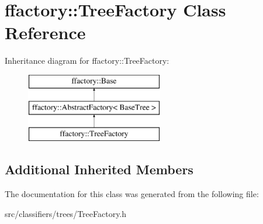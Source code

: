 \hypertarget{classffactory_1_1_tree_factory}{\section{ffactory\-:\-:Tree\-Factory Class Reference}
\label{classffactory_1_1_tree_factory}
}
Inheritance diagram for ffactory\-:\-:Tree\-Factory\-:\begin{figure}[H]
\begin{center}
\leavevmode
\includegraphics[height=3.000000cm]{classffactory_1_1_tree_factory}
\end{center}
\end{figure}
\subsection*{Additional Inherited Members}


The documentation for this class was generated from the following file\-:\begin{DoxyCompactItemize}
\item 
src/classifiers/trees/Tree\-Factory.\-h\end{DoxyCompactItemize}
